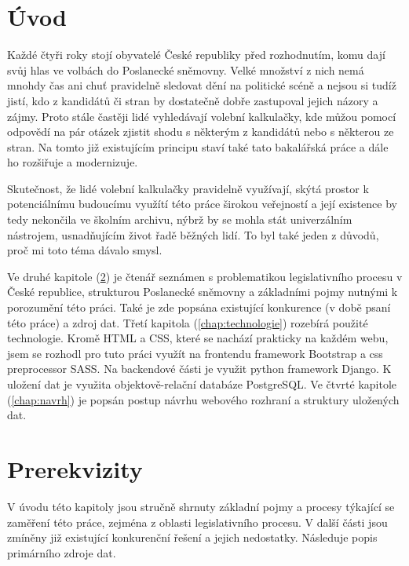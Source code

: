 
\chapter{Úvod}
Každé čtyři roky stojí obyvatelé České republiky před rozhodnutím, komu dají svůj hlas ve volbách do Poslanecké sněmovny. Velké množství z nich nemá mnohdy čas ani chuť pravidelně sledovat dění na politické scéně a nejsou si tudíž jistí, kdo z kandidátů či stran by dostatečně dobře zastupoval jejich názory a zájmy. Proto stále častěji lidé vyhledávají volební kalkulačky, kde můžou pomocí odpovědí na pár otázek zjistit shodu s některým z kandidátů nebo s některou ze stran. Na tomto již existujícím principu staví také tato bakalářská práce a dále ho rozšiřuje a modernizuje. 
\par Skutečnost, že lidé volební kalkulačky pravidelně využívají, skýtá prostor k potenciálnímu budoucímu využítí této práce širokou veřejností a její existence by tedy nekončila ve školním archivu, nýbrž by se mohla stát univerzálním nástrojem, usnadňujícím život řadě běžných lidí. To byl také jeden z důvodů, proč mi toto téma dávalo smysl.
\par Ve druhé kapitole (\ref{chap:Prerekvizity}) je čtenář seznámen s problematikou legislativního procesu v České republice, strukturou Poslanecké sněmovny a základními pojmy nutnými k porozumění této práci. Také je zde popsána existující konkurence (v době psaní této práce) a zdroj dat. Třetí kapitola (\ref{chap:technologie}) rozebírá použité technologie. Kromě HTML a CSS, které se nachází prakticky na každém webu, jsem se rozhodl pro tuto práci využít na frontendu framework Bootstrap a css preprocessor SASS. Na backendové části je využit python framework Django. K uložení dat je využita objektově-relační databáze PostgreSQL. Ve čtvrté kapitole (\ref{chap:navrh}) je popsán postup návrhu webového rozhraní a struktury uložených dat.\\










\chapter{Prerekvizity}
\label{chap:Prerekvizity}
V úvodu této kapitoly jsou stručně shrnuty základní pojmy a procesy týkající se zaměření této práce, zejména z oblasti legislativního procesu. V další části jsou zmíněny již existující konkurenční řešení a jejich nedostatky. Následuje popis primárního zdroje dat.


